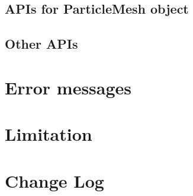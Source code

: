 \documentclass[12pt,a4paper,dvipdfmx]{book} %
\begin{document}
\section{APIs for ParticleMesh object}
\label{sec:PM_APIs}

\newpage
\section{Other APIs}
\label{sec:other_APIs}

\newpage

\chapter{Error messages}
\label{chap:error_messages}

\newpage

\chapter{Limitation}
\label{chap:limitation}

\newpage

\chapter{Change Log}
\label{chap:change_log}


\printindex
\end{document}
